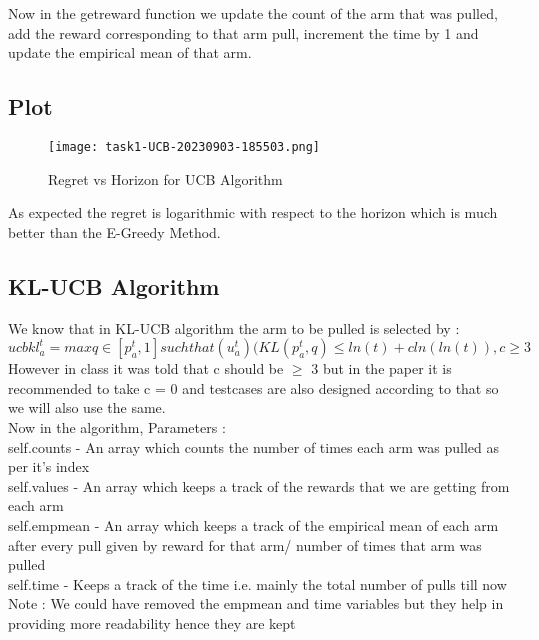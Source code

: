 \documentclass{article}
\begin{document}
Now in the getreward function we update the count of the arm that was pulled, add the reward corresponding to that arm pull, increment the time by 1 and update the empirical mean of that arm.\\



\subsection{Plot}
\begin{figure}[H]
\centering
\texttt{[image: task1-UCB-20230903-185503.png]}
\caption{Regret vs Horizon for UCB Algorithm}
\end{figure}


As expected the regret is logarithmic with respect to the horizon which is much better than the E-Greedy Method.

\subsection{KL-UCB Algorithm}
We know that in KL-UCB algorithm the arm to be pulled is selected by :\\

$ ucbkl_a^t = max{ q \in [ p_a^t,1 ] such that (u_a^t)(KL( p_a^t, q) \leq ln(t) + cln(ln(t)) } , c \geq 3$\\

However in class it was told that c should be $\geq$ 3 but in the paper it is recommended to take c = 0 and testcases are also designed according to that so we will also use the same.\\


Now in the algorithm, Parameters : \\
self.counts - An array which counts the number of times each arm was pulled as per it's index\\
self.values - An array which keeps a track of the rewards that we are getting from each arm\\
self.empmean - An array which keeps a track of the empirical mean of each arm after every pull given by reward for that arm/ number of times that arm was pulled\\
self.time - Keeps a track of the time i.e. mainly the total number of pulls till now \\

Note : We could have removed the empmean and time variables but they help in providing more readability hence they are kept \\
\end{document}
